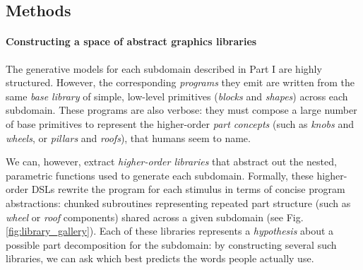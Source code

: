 \documentclass[10pt,letterpaper]{article}
\begin{document}




\subsection{Methods}
\paragraph{Constructing a space of abstract graphics libraries}
The generative models for each subdomain described in Part I are highly structured. However, the corresponding \textit{programs} they emit are written from the same \textit{base library} of simple, low-level primitives (\textit{blocks} and \textit{shapes}) across each subdomain. These programs are also verbose: they must compose a large number of base primitives to represent the higher-order \textit{part concepts} (such as \textit{knobs} and \textit{wheels}, or \textit{pillars} and \textit{roofs}), that humans seem to name.

We can, however, extract \textit{higher-order libraries} that abstract out the nested, parametric functions used to generate each subdomain. Formally, these higher-order DSLs rewrite the program for each stimulus in terms of concise program abstractions: chunked subroutines representing repeated part structure (such as \textit{wheel} or \textit{roof} components) shared across a given subdomain
(see Fig. \ref{fig:library_gallery}). Each of these libraries represents a \textit{hypothesis} about a possible part decomposition for the subdomain: by constructing several such libraries, we can ask which best predicts the words people actually use.
\end{document}
